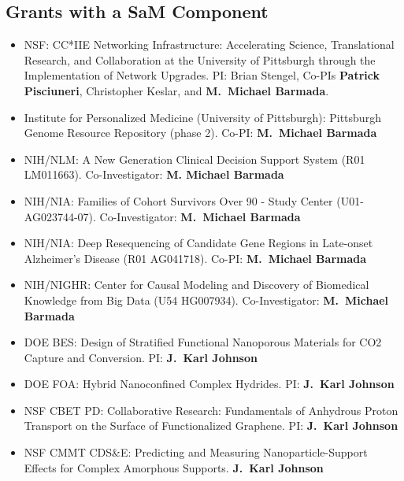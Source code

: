 \subsection{Grants with a SaM Component}
\begin{itemize}
    \item NSF: CC*IIE Networking Infrastructure: Accelerating Science,
          Translational Research, and Collaboration at the University of
          Pittsburgh through the Implementation of Network Upgrades.  PI:
          Brian Stengel, Co-PIs \textbf{Patrick Pisciuneri}, Christopher
          Keslar, and \textbf{M.\ Michael Barmada}.

    \item Institute for Personalized Medicine (University of Pittsburgh): Pittsburgh Genome Resource Repository (phase 2). Co-PI: \textbf{M.\ Michael Barmada}

    \item NIH/NLM: A New Generation Clinical Decision Support System (R01
          LM011663). Co-Investigator: \textbf{M. Michael Barmada}

    \item NIH/NIA: Families of Cohort Survivors Over 90 - Study Center
          (U01-AG023744-07). Co-Investigator: \textbf{M.\ Michael
          Barmada}

    \item NIH/NIA: Deep Resequencing of Candidate Gene Regions in Late-onset Alzheimer's Disease (R01 AG041718). Co-PI: \textbf{M.\ Michael
          Barmada}

    \item NIH/NIGHR: Center for Causal Modeling and Discovery of Biomedical Knowledge from Big Data (U54 HG007934). Co-Investigator: \textbf{M.\ Michael Barmada}

	\item DOE BES: Design of Stratified Functional Nanoporous Materials for CO2 Capture and Conversion. PI: \textbf{J.\ Karl Johnson}

	\item DOE FOA: Hybrid Nanoconfined Complex Hydrides. PI: \textbf{J.\ Karl Johnson}

	\item NSF CBET PD: Collaborative Research: Fundamentals of Anhydrous Proton Transport on the Surface of Functionalized Graphene. PI: \textbf{J.\ Karl Johnson}

	\item NSF CMMT CDS\&E: Predicting and Measuring Nanoparticle-Support Effects for Complex Amorphous Supports. \textbf{J.\ Karl Johnson}


\end{itemize}
